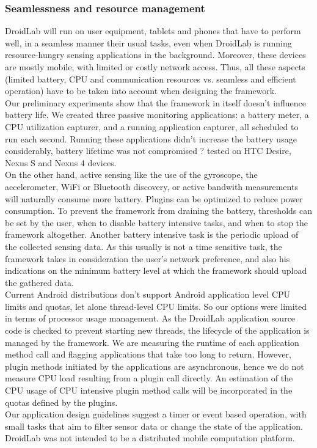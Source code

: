 \documentclass[conference,letterpaper]{IEEEtran}
\begin{document}
\subsubsection{Seamlessness and resource management}
DroidLab will run on user equipment, tablets and phones that have to perform well, in a seamless manner their usual tasks, even when DroidLab is running resource-hungry sensing applications in the background. Moreover, these devices are mostly mobile, with limited or costly network access. Thus, all these aspects (limited battery, CPU and communication resources vs. seamless and efficient operation) have to be taken into account when designing the framework. \\
\indent Our preliminary experiments show that the framework in itself doesn't influence battery life. We created three passive monitoring applications: a battery meter, a CPU utilization capturer, and a running application capturer, all scheduled to run each second. Running these applications didn't increase the battery usage considerably, battery lifetime was not compromised ? tested on HTC Desire, Nexus S and Nexus 4 devices.\\
\indent On the other hand, active sensing like the use of the gyroscope, the accelerometer, WiFi or Bluetooth discovery, or active bandwith measurements will naturally consume more battery. Plugins can be optimized to reduce power consumption. To prevent the framework from draining the battery, thresholds can be set by the user, when to disable battery intensive tasks, and when to stop the framework altogether.
Another battery intensive task is the periodic upload of the collected sensing data. As this usually is not a time sensitive task, the framework takes in consideration the user's network preference, and also his indications on the minimum battery level at which the framework should upload the gathered data.\\
\indent Current Android distributions don't support Android application level CPU limits and quotas, let alone thread-level CPU limits. So our options were limited in terms of processor usage management. As the DroidLab application source code is checked to prevent starting new threads, the lifecycle of the application is managed by the framework. We are measuring the runtime of each application method call and flagging applications that take too long to return. However, plugin methods initiated by the applications are asynchronous, hence we do not measure CPU load resulting from a plugin call directly. An estimation of the CPU usage of CPU intensive plugin method calls will be incorporated in the quotas defined by the plugins.\\
\indent Our application design guidelines suggest a timer or event based operation, with small tasks that aim to filter sensor data or change the state of the application. DroidLab was not intended to be a distributed mobile computation platform.
\end{document}
